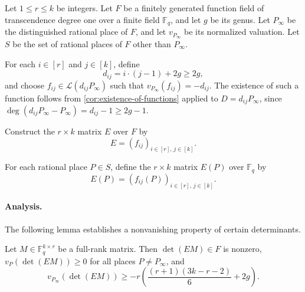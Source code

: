 \documentclass[11pt]{article}
\newcommand{\F}{\mathbb{F}}
\begin{document}
Let $1\le r\le k$ be integers.
Let $F$ be a finitely generated function field of transcendence degree one over a finite field $\F_q$, and let $g$ be its genus.
Let $P_\infty$ be the distinguished rational place of $F$, and let $v_{P_\infty}$ be its normalized valuation. Let $S$ be the set of rational places of $F$ other than $P_\infty$.


For each $i\in [r]$ and $j\in [k]$, define
\[
d_{ij}=i\cdot (j-1)+2g\geq 2g,
\]
and choose $f_{ij}\in \mathcal{L}(d_{ij}P_\infty)$ such that $v_{P_\infty}(f_{ij})=-d_{ij}$.
The existence of such a function follows from \cref{cor:existence-of-functions} applied to $D=d_{ij}P_\infty$, since
$\deg(d_{ij}P_\infty-P_\infty)=d_{ij}-1\ge 2g-1$.

Construct the $r\times k$ matrix $E$ over $F$ by
\[
E=(f_{ij})_{i\in [r],\, j\in [k]}.
\]

For each rational place $P\in S$, define the $r\times k$ matrix $E(P)$ over $\F_q$ by
\[
E(P)=(f_{ij}(P))_{i\in [r],\, j\in [k]}.
\]

\paragraph{Analysis.}

The following lemma establishes a nonvanishing property of certain determinants.

\begin{lemma}\label{lem:GR-deg}
Let $M\in \mathbb{F}_q^{k\times r}$ be a full-rank matrix. Then $\det(EM)\in F$ is nonzero, $v_P(\det(EM))\geq 0$ for all places $P\neq P_\infty$, and
\[
v_{P_\infty}(\det(EM))\geq -r\left(\frac{(r+1)(3k-r-2)}{6}+2g\right).
\]
\end{lemma}
\end{document}
